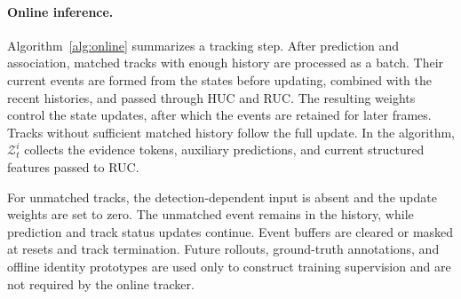 \documentclass[a4paper,fleqn]{cas-sc}
\begin{document}
\paragraph{Online inference.}
Algorithm~\ref{alg:online} summarizes a tracking step. After prediction and association, matched tracks with enough history are processed as a batch. Their current events are formed from the states before updating, combined with the recent histories, and passed through HUC and RUC. The resulting weights control the state updates, after which the events are retained for later frames. Tracks without sufficient matched history follow the full update. In the algorithm, $\mathcal{Z}_t^i$ collects the evidence tokens, auxiliary predictions, and current structured features passed to RUC.

For unmatched tracks, the detection-dependent input is absent and the update weights are set to zero. The unmatched event remains in the history, while prediction and track status updates continue. Event buffers are cleared or masked at resets and track termination. Future rollouts, ground-truth annotations, and offline identity prototypes are used only to construct training supervision and are not required by the online tracker.
\end{document}
